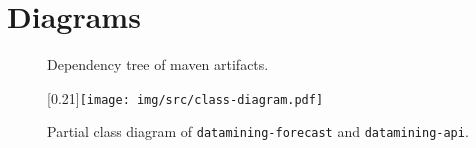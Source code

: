 \chapter{Diagrams}
    \begin{figure}[H]
        \begin{center}
            \caption{Dependency tree of maven artifacts.}
            \label{appen:maven-deps}
        \end{center}
    \end{figure}

    \begin{figure}[H]
        \begin{center}
            \scalebox{0.35}[0.21]{\texttt{[image: img/src/class-diagram.pdf]}}
            \caption{Partial class diagram of \texttt{datamining-forecast} and \texttt{datamining-api}.}
            \label{appen:class-diagram}
        \end{center}
    \end{figure}

